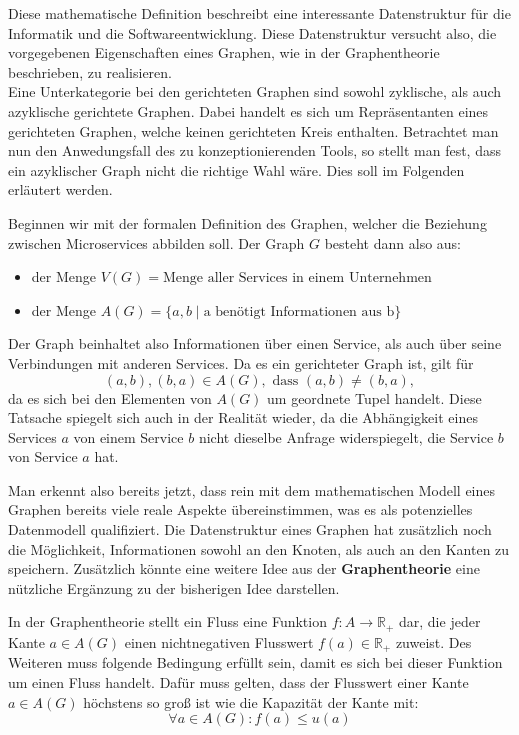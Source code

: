 Diese mathematische Definition beschreibt eine interessante Datenstruktur für die Informatik und die Softwareentwicklung. Diese Datenstruktur versucht also, die vorgegebenen Eigenschaften eines Graphen, wie in der Graphentheorie beschrieben, zu realisieren. \\
Eine Unterkategorie bei den gerichteten Graphen sind sowohl zyklische, als auch azyklische gerichtete Graphen. Dabei handelt es sich um Repräsentanten eines gerichteten Graphen, welche keinen gerichteten Kreis enthalten. Betrachtet man nun den Anwedungsfall des zu konzeptionierenden Tools, so stellt man fest, dass ein azyklischer Graph nicht die richtige Wahl wäre. Dies soll im Folgenden erläutert werden.

\begin{example}
	Beginnen wir mit der formalen Definition des Graphen, welcher die Beziehung zwischen Microservices abbilden soll. Der Graph $G$ besteht dann also aus: 
	\begin{itemize}
		\item der Menge $V(G)=\text{Menge aller Services in einem Unternehmen}$
		\item der Menge $A(G)=\{a,b \mid \text{a benötigt Informationen aus b}\}$
	\end{itemize}
	Der Graph beinhaltet also Informationen über einen Service, als auch über seine Verbindungen mit anderen Services. Da es ein gerichteter Graph ist, gilt für $$(a,b), (b,a) \in A(G),\text{ dass }(a,b) \neq (b,a),$$ da es sich bei den Elementen von $A(G)$ um geordnete Tupel handelt. Diese Tatsache spiegelt sich auch in der Realität wieder, da die Abhängigkeit eines Services $a$ von einem Service $b$ nicht dieselbe Anfrage widerspiegelt, die Service $b$ von Service $a$ hat.
\end{example}\label{exp:microserviceGraph}

Man erkennt also bereits jetzt, dass rein mit dem mathematischen Modell eines Graphen bereits viele reale Aspekte übereinstimmen, was es als potenzielles Datenmodell qualifiziert. Die Datenstruktur eines Graphen hat zusätzlich noch die Möglichkeit, Informationen sowohl an den Knoten, als auch an den Kanten zu speichern. Zusätzlich könnte eine weitere Idee aus der \textbf{Graphentheorie} eine nützliche Ergänzung zu der bisherigen Idee darstellen.

\begin{definition}[Fluss]\label{def:Fluss}
	In der Graphentheorie stellt ein Fluss eine Funktion $f: A \rightarrow \mathbb{R_+}$ dar, die jeder Kante $a \in A(G)$ einen nichtnegativen Flusswert $f(a) \in \mathbb{R_+}$ zuweist. Des Weiteren muss folgende Bedingung erfüllt sein, damit es sich bei dieser Funktion um einen Fluss handelt. Dafür muss gelten, dass der Flusswert einer Kante $a \in A(G)$ höchstens so groß ist wie die Kapazität der Kante mit: \autocite[S. 3ff]{ford2015flows} $$\forall a \in A(G): f(a) \leq u(a)$$
\end{definition}

